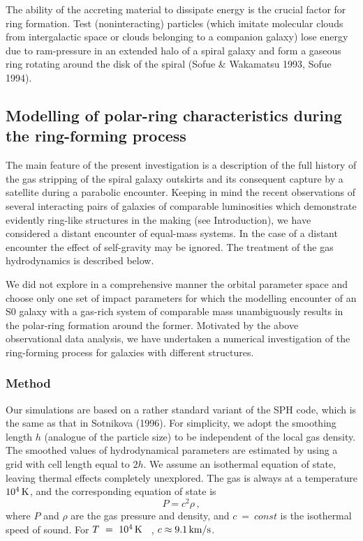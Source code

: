 The ability of the accreting material to dissipate energy 
is the crucial factor for ring formation. Test (noninteracting) 
particles (which imitate molecular clouds from intergalactic space 
or clouds belonging to a companion galaxy) lose 
energy due to ram-pressure in an extended halo of a spiral  
galaxy and form a gaseous ring rotating around the disk of the spiral 
(Sofue \& Wakamatsu 1993, Sofue 1994).

\subsection{Modelling of polar-ring characteristics 
during the ring-forming process}

The main feature of the present investigation is a description of 
the full history of the gas stripping of the spiral galaxy outskirts 
and its consequent capture by a satellite during a parabolic encounter. 
Keeping in mind the recent observations of several 
interacting pairs of galaxies of comparable luminosities which 
demonstrate evidently ring-like structures in the making (see Introduction), 
we have considered a distant encounter of equal-mass systems. 
In the case of a distant encounter the effect of self-gravity may be 
ignored. The treatment 
of the gas hydrodynamics is described below. 

We did not explore in a comprehensive manner 
the orbital parameter space and choose only one set of impact 
parameters for which the modelling encounter of an S0 galaxy with a 
gas-rich system of comparable mass unambiguously results in the polar-ring 
formation around the former. Motivated by the above observational 
data analysis, we have undertaken a numerical investigation  
of the ring-forming process for galaxies with 
different structures. 
 
\subsubsection{Method}
Our simulations are based on a rather standard variant of the SPH 
code, which is the same as that in Sotnikova (1996). For simplicity,  
we adopt the smoothing length $h$ (analogue of the particle size) to 
be independent of the local gas density. The smoothed values of 
hydrodynamical parameters are estimated by using a grid with  
cell length equal to $2h$. We assume an isothermal equation 
of state, leaving thermal effects completely unexplored. The 
gas is always at a temperature $10^4 \, {\rm K}$,  and the corresponding 
equation of state is
$$
P = c^2\rho \, ,
$$ 
where $P$ and $\rho$ are the gas pressure and density, and $c~=~const$ 
is the isothermal speed of sound. For $T~=~10^4 \,{\rm K}$ \, ,
$c\approx9.1 \, {\rm km/s}$.

